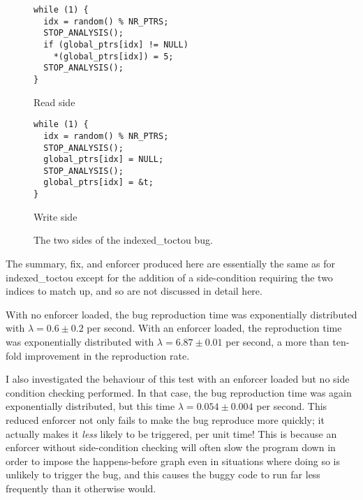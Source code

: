 \begin{figure}
  \begin{subfloat}
    \begin{minipage}{50mm}
\begin{verbatim}
while (1) {
  idx = random() % NR_PTRS;
  STOP_ANALYSIS();
  if (global_ptrs[idx] != NULL)
    *(global_ptrs[idx]) = 5;
  STOP_ANALYSIS();
}
\end{verbatim}
    \end{minipage}
    \caption{Read side}
  \end{subfloat}
  \begin{subfloat}
    \begin{minipage}{50mm}
\begin{verbatim}
while (1) {
  idx = random() % NR_PTRS;
  STOP_ANALYSIS();
  global_ptrs[idx] = NULL;
  STOP_ANALYSIS();
  global_ptrs[idx] = &t;
}
\end{verbatim}
    \end{minipage}
    \caption{Write side}
  \end{subfloat}
  \caption{The two sides of the indexed\_toctou bug.}
  \label{fig:eval:indexed_toctou}
\end{figure}

The summary, fix, and enforcer produced here are essentially the same
as for indexed\_toctou except for the addition of a side-condition
requiring the two indices to match up, and so are not discussed in
detail here.

With no enforcer loaded, the bug reproduction time was exponentially
distributed with $\lambda = 0.6 \pm 0.2$ per second.  With an enforcer
loaded, the reproduction time was exponentially distributed with
$\lambda = 6.87 \pm 0.01$ per second, a more than ten-fold improvement
in the reproduction rate.

I also investigated the behaviour of this test with an enforcer loaded
but no side condition checking performed.  In that case, the bug
reproduction time was again exponentially distributed, but this time
$\lambda = 0.054 \pm 0.004$ per second.  This reduced enforcer not
only fails to make the bug reproduce more quickly; it actually makes
it \emph{less} likely to be triggered, per unit time!  This is because
an enforcer without side-condition checking will often slow the
program down in order to impose the happens-before graph even in
situations where doing so is unlikely to trigger the bug, and this
causes the buggy code to run far less frequently than it otherwise
would.



